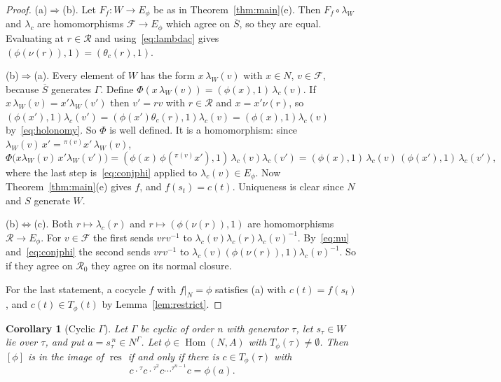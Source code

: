\documentclass[12pt,letterpaper]{article}
\numberwithin{equation}{section}
\theoremstyle{plain}
\newtheorem{corollary}[theorem]{Corollary}
\theoremstyle{definition}
\newcommand{\act}[2]{{}^{#1}\!#2}          %
\newcommand{\fr}{\mathcal{F}}             %
\newcommand{\rel}{\mathcal{R}}            %
\DeclareMathOperator{\Hom}{Hom}
\DeclareMathOperator{\res}{res}
\begin{document}
\begin{proof}
(a)$\Rightarrow$(b). Let $F_f:W\to E_\phi$ be as in
Theorem~\ref{thm:main}(e). Then $F_f\circ\lambda_W$ and $\lambda_c$ are
homomorphisms $\fr\to E_\phi$ which agree on $\overline{S}$, so they are
equal. Evaluating at $r\in\rel$ and using~\eqref{eq:lambdac} gives
$(\phi(\nu(r)),1)=(\theta_c(r),1)$.

(b)$\Rightarrow$(a). Every element of $W$ has the form $x\,\lambda_W(v)$
with $x\in N$, $v\in\fr$, because $\overline{S}$ generates $\Gamma$. Define
$\Phi(x\,\lambda_W(v))=(\phi(x),1)\,\lambda_c(v)$. If
$x\,\lambda_W(v)=x'\lambda_W(v')$ then $v'=rv$ with $r\in\rel$ and
$x=x'\nu(r)$, so
$(\phi(x'),1)\lambda_c(v')=(\phi(x')\theta_c(r),1)\lambda_c(v)
=(\phi(x),1)\lambda_c(v)$ by~\eqref{eq:holonomy}. So $\Phi$ is well
defined. It is a homomorphism: since
$\lambda_W(v)\,x'=\act{\pi(v)}{x'}\,\lambda_W(v)$,
\[
\Phi\bigl(x\lambda_W(v)\,x'\lambda_W(v')\bigr)
=(\phi(x)\,\phi(\act{\pi(v)}{x'}),1)\,\lambda_c(v)\lambda_c(v')
=(\phi(x),1)\,\lambda_c(v)\,(\phi(x'),1)\,\lambda_c(v'),
\]
where the last step is~\eqref{eq:conjphi} applied to $\lambda_c(v)\in
E_\phi$. Now Theorem~\ref{thm:main}(e) gives $f$, and $f(s_t)=c(t)$.
Uniqueness is clear since $N$ and $S$ generate $W$.

(b)$\Leftrightarrow$(c). Both $r\mapsto\lambda_c(r)$ and
$r\mapsto(\phi(\nu(r)),1)$ are homomorphisms $\rel\to E_\phi$. For
$v\in\fr$ the first sends $vrv^{-1}$ to
$\lambda_c(v)\lambda_c(r)\lambda_c(v)^{-1}$. By~\eqref{eq:nu}
and~\eqref{eq:conjphi} the second sends $vrv^{-1}$ to
$\lambda_c(v)(\phi(\nu(r)),1)\lambda_c(v)^{-1}$. So if they agree on
$\rel_0$ they agree on its normal closure.

For the last statement, a cocycle $f$ with $f|_N=\phi$ satisfies (a) with
$c(t)=f(s_t)$, and $c(t)\in T_\phi(t)$ by Lemma~\ref{lem:restrict}.
\end{proof}

\begin{corollary}[Cyclic $\Gamma$]\label{cor:cyclic}
Let $\Gamma$ be cyclic of order $n$ with generator $\tau$, let $s_\tau\in
W$ lie over $\tau$, and put $a=s_\tau^{\,n}\in N^\Gamma$. Let
$\phi\in\Hom(N,A)$ with $T_\phi(\tau)\neq\emptyset$. Then $[\phi]$ is in
the image of $\res$ if and only if there is $c\in T_\phi(\tau)$ with
\begin{equation}\label{eq:twistednorm}
c\cdot\act{\tau}{c}\cdot\act{\tau^2}{c}\cdots\act{\tau^{n-1}}{c}=\phi(a).
\end{equation}
\end{corollary}
\end{document}
